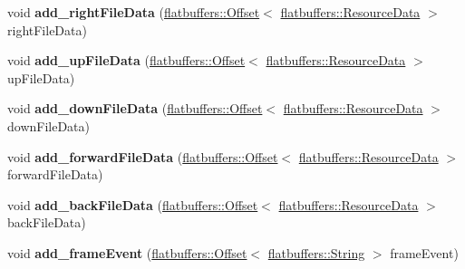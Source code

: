 \begin{DoxyCompactItemize}
void {\bfseries add\+\_\+right\+File\+Data} (\hyperlink{structflatbuffers_1_1Offset}{flatbuffers\+::\+Offset}$<$ \hyperlink{structflatbuffers_1_1ResourceData}{flatbuffers\+::\+Resource\+Data} $>$ right\+File\+Data)
\item 
\mbox{\label{structflatbuffers_1_1GameNode3DOptionBuilder_acaf7a327016c7507983e40c2172438b9}} 
void {\bfseries add\+\_\+up\+File\+Data} (\hyperlink{structflatbuffers_1_1Offset}{flatbuffers\+::\+Offset}$<$ \hyperlink{structflatbuffers_1_1ResourceData}{flatbuffers\+::\+Resource\+Data} $>$ up\+File\+Data)
\item 
\mbox{\label{structflatbuffers_1_1GameNode3DOptionBuilder_a2c7318b090906c2a078f7ad3d2f49c7c}} 
void {\bfseries add\+\_\+down\+File\+Data} (\hyperlink{structflatbuffers_1_1Offset}{flatbuffers\+::\+Offset}$<$ \hyperlink{structflatbuffers_1_1ResourceData}{flatbuffers\+::\+Resource\+Data} $>$ down\+File\+Data)
\item 
\mbox{\label{structflatbuffers_1_1GameNode3DOptionBuilder_a5a44a54f253146ffb3c91294d863a7e5}} 
void {\bfseries add\+\_\+forward\+File\+Data} (\hyperlink{structflatbuffers_1_1Offset}{flatbuffers\+::\+Offset}$<$ \hyperlink{structflatbuffers_1_1ResourceData}{flatbuffers\+::\+Resource\+Data} $>$ forward\+File\+Data)
\item 
\mbox{\label{structflatbuffers_1_1GameNode3DOptionBuilder_af8f7af65ac5d55d372fe86408815491e}} 
void {\bfseries add\+\_\+back\+File\+Data} (\hyperlink{structflatbuffers_1_1Offset}{flatbuffers\+::\+Offset}$<$ \hyperlink{structflatbuffers_1_1ResourceData}{flatbuffers\+::\+Resource\+Data} $>$ back\+File\+Data)
\item 
\mbox{\label{structflatbuffers_1_1GameNode3DOptionBuilder_aae4dc862d2fbb189bed33be2df4016f5}} 
void {\bfseries add\+\_\+frame\+Event} (\hyperlink{structflatbuffers_1_1Offset}{flatbuffers\+::\+Offset}$<$ \hyperlink{structflatbuffers_1_1String}{flatbuffers\+::\+String} $>$ frame\+Event)
\item 
\mbox{\label{structflatbuffers_1_1GameNode3DOptionBuilder_aa619e82aef1ea7df0e39c5adeecbcf4e}} 

\end{DoxyCompactItemize}
